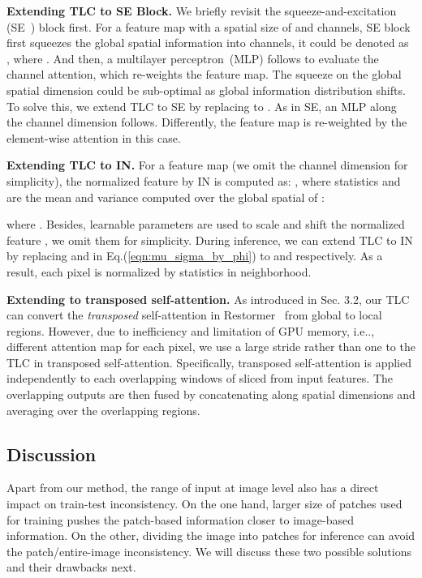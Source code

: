 \documentclass[runningheads]{llncs}
\makeatletter
\DeclareRobustCommand\onedot{\futurelet\@let@token\@onedot}
\def\@onedot{\ifx\@let@token.\else.\null\fi\xspace}
\def\ie{i.e\onedot}
\makeatother
\begin{document}
\textbf{Extending TLC to SE Block.} 
We briefly revisit the squeeze-and-excitation (SE~\cite{hu2018squeeze}) block first. For a feature map  with a spatial size of  and  channels, SE block first squeezes the global spatial information into channels, it could be denoted as , where . And then, a multilayer perceptron~(MLP) follows to evaluate the channel attention, which re-weights the feature map. 
The squeeze on the global spatial dimension could be sub-optimal as global information distribution shifts. To solve this, we extend TLC to SE by replacing  to . As in SE, an MLP along the channel dimension follows. Differently, the feature map is re-weighted by the element-wise attention in this case. 

\textbf{Extending TLC to IN.}
For a feature map  (we omit the channel dimension for simplicity), the normalized feature  by IN is computed as:  ,
where statistics  and  are the mean and variance computed over the global spatial of :

where . Besides, learnable parameters  are used to scale and shift the normalized feature , we omit them for simplicity.
During inference, we can extend TLC to IN by replacing  and  in Eq.(\ref{eqn:mu_sigma_by_phi}) to  and  respectively. As a result, each pixel is normalized by statistics in neighborhood.

\textbf{Extending to transposed self-attention.}
As introduced in Sec. 3.2, our TLC can convert the \textit{transposed} self-attention in Restormer~\cite{zamir2021restormer} from global to local regions. However, due to inefficiency and limitation of GPU memory, \ie, different attention map for each pixel, we use a large stride rather than one to the TLC in transposed self-attention. Specifically, transposed self-attention is applied independently to each overlapping windows of  sliced from input features. The overlapping outputs are then fused by concatenating along spatial dimensions and averaging over the overlapping regions.  

\subsection{Discussion}
Apart from our method, the range of input at image level also has a direct impact on train-test inconsistency. On the one hand, larger size of patches used for training pushes the patch-based information closer to image-based information. On the other, dividing the image into patches for inference can avoid the patch/entire-image inconsistency. 
We will discuss these two possible solutions and their drawbacks next.
\end{document}
